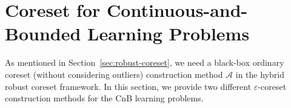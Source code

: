 \documentclass{article}
\newtheorem{lemma}{Lemma}
\begin{document}



\section{Coreset for Continuous-and-Bounded Learning Problems}\label{standard-coreset}
As mentioned in Section~\ref{sec:robust-coreset}, we need a black-box ordinary coreset (without considering outliers) construction method $\mathcal{A}$ in the hybrid robust coreset framework. In this section, we provide two different $\varepsilon $-coreset construction methods for the CnB learning problems. 
\end{document}
